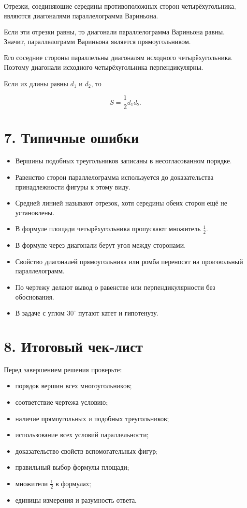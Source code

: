 \documentclass[a4paper,12pt]{article}
\begin{document}
Отрезки, соединяющие середины противоположных сторон четырёхугольника, являются диагоналями параллелограмма Вариньона.

Если эти отрезки равны, то диагонали параллелограмма Вариньона равны. Значит, параллелограмм Вариньона является прямоугольником.

Его соседние стороны параллельны диагоналям исходного четырёхугольника. Поэтому диагонали исходного четырёхугольника перпендикулярны.

Если их длины равны $d_1$ и $d_2$, то

\[
\boxed{S=\frac12 d_1d_2}.
\]

\section*{\color{darkaccent}7. Типичные ошибки}

\begin{itemize}
    \item Вершины подобных треугольников записаны в несогласованном порядке.
    \item Равенство сторон параллелограмма используется до доказательства принадлежности фигуры к этому виду.
    \item Средней линией называют отрезок, хотя середины обеих сторон ещё не установлены.
    \item В формуле площади четырёхугольника пропускают множитель $\frac12$.
    \item В формуле через диагонали берут угол между сторонами.
    \item Свойство диагоналей прямоугольника или ромба переносят на произвольный параллелограмм.
    \item По чертежу делают вывод о равенстве или перпендикулярности без обоснования.
    \item В задаче с углом $30^\circ$ путают катет и гипотенузу.
\end{itemize}

\section*{\color{darkaccent}8. Итоговый чек-лист}

Перед завершением решения проверьте:

\begin{itemize}
    \item[$\square$] порядок вершин всех многоугольников;
    \item[$\square$] соответствие чертежа условию;
    \item[$\square$] наличие прямоугольных и подобных треугольников;
    \item[$\square$] использование всех условий параллельности;
    \item[$\square$] доказательство свойств вспомогательных фигур;
    \item[$\square$] правильный выбор формулы площади;
    \item[$\square$] множители $\frac12$ в формулах;
    \item[$\square$] единицы измерения и разумность ответа.
\end{itemize}
\end{document}
